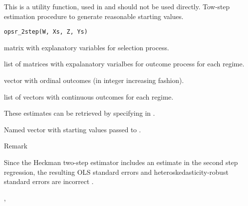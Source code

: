 %
\begin{Description}
This is a utility function, used in  and should not be used directly.
Tow-step estimation procedure to generate reasonable starting values.
\end{Description}
%
\begin{Usage}
\begin{verbatim}
opsr_2step(W, Xs, Z, Ys)
\end{verbatim}
\end{Usage}
%
\begin{Arguments}
\begin{ldescription}
\item[\code{W}] matrix with explanatory variables for selection process.

\item[\code{Xs}] list of matrices with expalanatory varialbes for outcome process for each regime.

\item[\code{Z}] vector with ordinal outcomes (in integer increasing fashion).

\item[\code{Ys}] list of vectors with continuous outcomes for each regime.
\end{ldescription}
\end{Arguments}
%
\begin{Details}
These estimates can be retrieved by specifying  in .
\end{Details}
%
\begin{Value}
Named vector with starting values passed to .
\end{Value}
%
\begin{Section}{Remark}

Since the Heckman two-step estimator includes an estimate in the second step
regression, the resulting OLS standard errors and heteroskedasticity-robust
standard errors are incorrect \citep{Greene:2002}.
\end{Section}
%
\begin{References}
\end{References}
%
\begin{SeeAlso}
, 
\end{SeeAlso}

